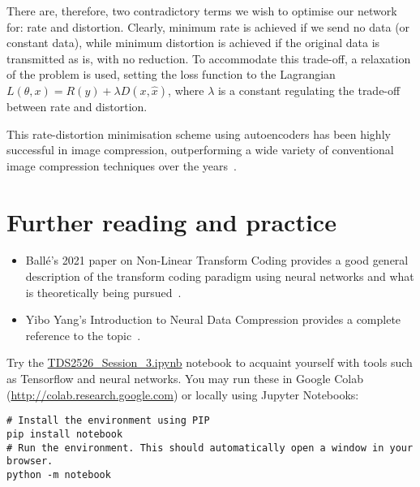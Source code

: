 There are, therefore, two contradictory terms we wish to optimise our network for: rate and distortion. Clearly, minimum rate is achieved if we send no data (or constant data), while minimum distortion is achieved if the original data is transmitted as is, with no reduction. To accommodate this trade-off, a relaxation of the problem is used, setting the loss function to the Lagrangian $L(\theta, x) = R(y) + \lambda D(x, \hat{x})$, where $\lambda$ is a constant regulating the trade-off between rate and distortion.

This rate-distortion minimisation scheme using autoencoders has been highly successful in image compression, outperforming a wide variety of conventional image compression techniques over the years~\cite{BalleLaparra2017factorised, balle2018hyperprior, minnen2018hierarchical, choi2019conditional, cheng2019residual, yang2020modulated, cheng2020gmm_attention, yang2021slimmable,  He2022ELIC, fu2024checkerboardresidual}.


\section*{Further reading and practice}
\vspace{0.25cm}

\begin{itemize}
\item Ballé's 2021 paper on Non-Linear Transform Coding provides a good general description of the transform coding paradigm using neural networks and what is theoretically being pursued~\cite{Balle2021NTC}.
\vspace{0.1cm}
\item Yibo Yang's Introduction to Neural Data Compression provides a complete reference to the topic~\cite{Yang2023Introduction}.
\end{itemize}

\begin{exercise}
Try the \url{TDS2526_Session_3.ipynb} notebook to acquaint yourself with tools such as Tensorflow and neural networks. You may run these in Google Colab (\url{http://colab.research.google.com}) or locally using Jupyter Notebooks:

\begin{verbatim}
# Install the environment using PIP
pip install notebook
# Run the environment. This should automatically open a window in your browser.
python -m notebook
\end{verbatim}
\end{exercise}
